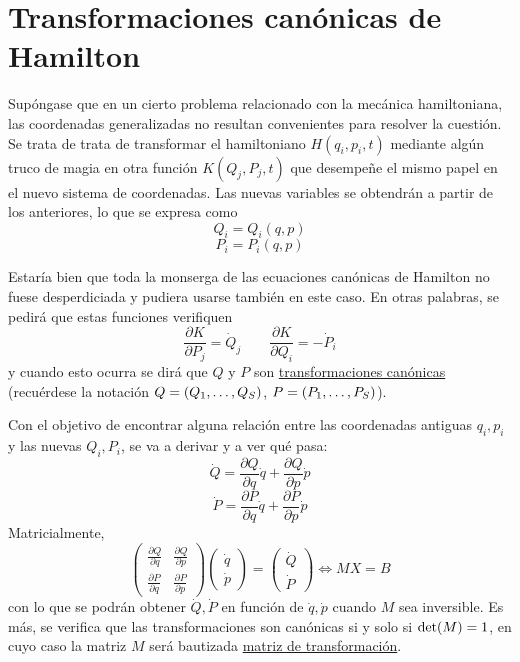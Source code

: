 \documentclass[12pt]{report}
\begin{document}
\section{Transformaciones canónicas de Hamilton}

Supóngase que en un cierto problema relacionado con la mecánica hamiltoniana, las coordenadas generalizadas no resultan convenientes para resolver la cuestión. Se trata de trata de transformar el hamiltoniano $H(q_i,p_i,t)$ mediante algún truco de magia en otra función $K(Q_j,P_j,t)$ que desempeñe el mismo papel en el nuevo sistema de coordenadas. Las nuevas variables se obtendrán a partir de los anteriores, lo que se expresa como
\[Q_i = Q_i(q,p)\]
\[P_i = P_i(q,p)\]

Estaría bien que toda la monserga de las ecuaciones canónicas de Hamilton no fuese desperdiciada y pudiera usarse también en este caso. En otras palabras, se pedirá que estas funciones verifiquen
\[\frac{\partial K}{\partial P_j} = \dot{Q}_j \qquad \frac{\partial K}{\partial Q_i} = - \dot{P}_i \tag{3}\]
y cuando esto ocurra se dirá que $Q$ y $P$ son \ul{transformaciones canónicas} (recuérdese la notación $Q = (Q_1,\mathellipsis,Q_S)$, $P = (P_1,\mathellipsis,P_S)$). 

\vspace{2mm}
Con el objetivo de encontrar alguna relación entre las coordenadas antiguas $q_i, p_i$ y las nuevas $Q_i, P_i$, se va a derivar y a ver qué pasa:
\[\dot{Q} = \frac{\partial Q}{\partial q}\dot{q} + \frac{\partial Q}{\partial p}\dot{p}\]
\[\dot{P} = \frac{\partial P}{\partial q}\dot{q} + \frac{\partial P}{\partial p}\dot{p}\]
Matricialmente,
\[ \begin{pmatrix} 
    \frac{\partial Q}{\partial q} & \frac{\partial Q}{\partial p} \\[5pt]
    \frac{\partial P}{\partial q} & \frac{\partial P}{\partial p}
\end{pmatrix} \begin{pmatrix} 
    \dot{q} \\[5pt]
    \dot{p}
\end{pmatrix} = \begin{pmatrix}
    \dot{Q} \\[5pt]
    \dot{P}
\end{pmatrix} \iff MX = B\]
con lo que se podrán obtener $\dot{Q}, \dot{P}$ en función de $\dot{q}, \dot{p}$ cuando $M$ sea inversible. Es más, se verifica que las transformaciones son canónicas si y solo si $\textup{det}(M) = 1$, en cuyo caso la matriz $M$ será bautizada \ul{matriz de transformación}.
\end{document}
